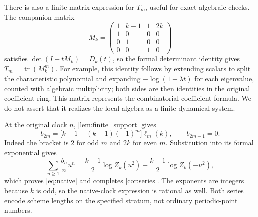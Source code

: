 There is also a finite matrix expression for $T_m$, useful for exact
algebraic checks. The companion matrix
\begin{equation}\label{eq:companion}
 M_k=\begin{pmatrix}
 1&k-1&1&2k\\
 1&0&0&0\\
 0&1&0&0\\
 0&0&1&0
 \end{pmatrix}
\end{equation}
satisfies $\det(I-tM_k)=D_k(t)$, so the formal determinant identity gives
$T_m=\operatorname{tr}(M_k^m)$. For example, this identity follows by
extending scalars to split the characteristic polynomial and expanding
$-\log(1-\lambda t)$ for each eigenvalue, counted with algebraic
multiplicity; both sides are then identities in the original coefficient
ring. This matrix represents the combinatorial coefficient formula. We
do not assert that it realizes the local algebra as a finite dynamical
system.

At the original clock $n$, \cref{lem:finite_support} gives
\begin{equation}\label{eq:bclock}
 b_{2m}=\bigl[k+1+(k-1)(-1)^m\bigr]\ell_m(k),\qquad b_{2m-1}=0.
\end{equation}
Indeed the bracket is $2$ for odd $m$ and $2k$ for even $m$.
Substitution into its formal exponential gives
\[
 \sum_{n\geq1}\frac{b_n}{n}u^n
 =\frac{k+1}{2}\log Z_k(u^2)
   +\frac{k-1}{2}\log Z_k(-u^2),
\]
which proves \eqref{eq:native} and completes \cref{cor:series}.
The exponents are integers because $k$ is odd, so the native-clock
expression is rational as well. Both series encode scheme lengths on the
specified stratum, not ordinary periodic-point numbers.
